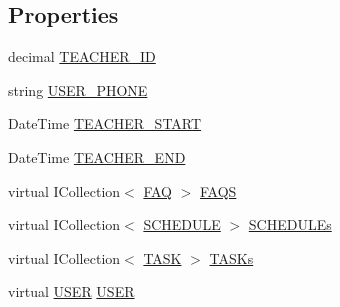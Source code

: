 \subsection*{Properties}
\begin{DoxyCompactItemize}
\item 
decimal \hyperlink{class_e_f_oracle_1_1_model_1_1_t_e_a_c_h_e_r_abd7ac87a9b40c35c8c4874e5a9ddc0b4}{T\+E\+A\+C\+H\+E\+R\+\_\+\+ID}
\item 
string \hyperlink{class_e_f_oracle_1_1_model_1_1_t_e_a_c_h_e_r_ae207019fe04cd3c49465d593c4e8613a}{U\+S\+E\+R\+\_\+\+P\+H\+O\+NE}
\item 
Date\+Time \hyperlink{class_e_f_oracle_1_1_model_1_1_t_e_a_c_h_e_r_a159a51c15e7f470125fc40153ae125a3}{T\+E\+A\+C\+H\+E\+R\+\_\+\+S\+T\+A\+RT}
\item 
Date\+Time \hyperlink{class_e_f_oracle_1_1_model_1_1_t_e_a_c_h_e_r_ac9832bea91be43f9086b205bb193802a}{T\+E\+A\+C\+H\+E\+R\+\_\+\+E\+ND}
\item 
virtual I\+Collection$<$ \hyperlink{class_e_f_oracle_1_1_model_1_1_f_a_q}{F\+AQ} $>$ \hyperlink{class_e_f_oracle_1_1_model_1_1_t_e_a_c_h_e_r_aaea5980125e899e806137205e80ae562}{F\+A\+QS}
\item 
virtual I\+Collection$<$ \hyperlink{class_e_f_oracle_1_1_model_1_1_s_c_h_e_d_u_l_e}{S\+C\+H\+E\+D\+U\+LE} $>$ \hyperlink{class_e_f_oracle_1_1_model_1_1_t_e_a_c_h_e_r_aad6a744573162cbfd23478627c0f4d57}{S\+C\+H\+E\+D\+U\+L\+Es}
\item 
virtual I\+Collection$<$ \hyperlink{class_e_f_oracle_1_1_model_1_1_t_a_s_k}{T\+A\+SK} $>$ \hyperlink{class_e_f_oracle_1_1_model_1_1_t_e_a_c_h_e_r_a9975a551c7f7d00a659c967edbf047f0}{T\+A\+S\+Ks}
\item 
virtual \hyperlink{class_e_f_oracle_1_1_model_1_1_u_s_e_r}{U\+S\+ER} \hyperlink{class_e_f_oracle_1_1_model_1_1_t_e_a_c_h_e_r_a0f8bad58a724b312d25a153e6fe2971c}{U\+S\+ER}
\end{DoxyCompactItemize}


